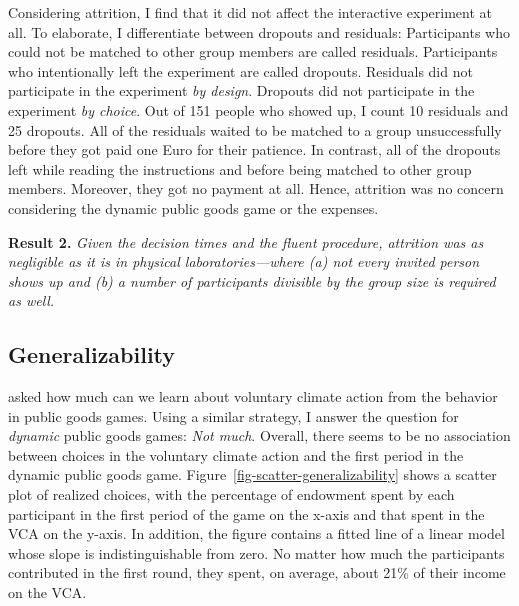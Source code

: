 \documentclass[
  authoryear,
  preprint,
  3p]{elsarticle}
\begin{document}
Considering attrition, I find that it did not affect the interactive
experiment at all. To elaborate, I differentiate between dropouts and
residuals: Participants who could not be matched to other group members
are called residuals. Participants who intentionally left the experiment
are called dropouts. Residuals did not participate in the experiment
\emph{by design}. Dropouts did not participate in the experiment
\emph{by choice}. Out of 151 people who showed up, I count 10 residuals
and 25 dropouts. All of the residuals waited to be matched to a group
unsuccessfully before they got paid one Euro for their patience. In
contrast, all of the dropouts left while reading the instructions and
before being matched to other group members. Moreover, they got no
payment at all. Hence, attrition was no concern considering the dynamic
public goods game or the expenses.

\textbf{Result 2.} \emph{Given the decision times and the fluent
procedure, attrition was as negligible as it is in physical
laboratories---where (a) not every invited person shows up and (b) a
number of participants divisible by the group size is required as well.}

\hypertarget{sec-generalizability}{%
\subsection{Generalizability}\label{sec-generalizability}}

\citet{GKLS2020} asked how much can we learn about voluntary climate
action from the behavior in public goods games. Using a similar
strategy, I answer the question for \emph{dynamic} public goods games:
\emph{Not much}. Overall, there seems to be no association between
choices in the voluntary climate action and the first period in the
dynamic public goods game. Figure~\ref{fig-scatter-generalizability}
shows a scatter plot of realized choices, with the percentage of
endowment spent by each participant in the first period of the game on
the x-axis and that spent in the VCA on the y-axis. In addition, the
figure contains a fitted line of a linear model whose slope is
indistinguishable from zero. No matter how much the participants
contributed in the first round, they spent, on average, about 21\% of
their income on the VCA.
\end{document}
